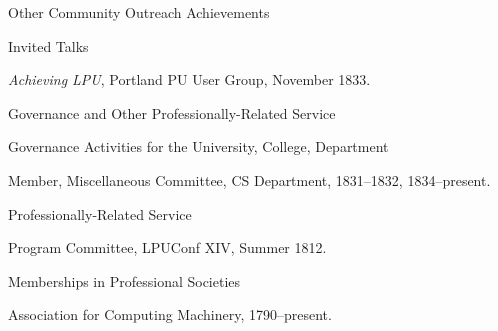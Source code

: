 \documentclass{psu-vita}
\begin{document}
%
\begin{majorhead}{Other Community Outreach Achievements}
  \begin{minorhead}{Invited Talks}
  \item {\em Achieving LPU},
    Portland PU User Group, November 1833.
  \end{minorhead}
\end{majorhead}
%
%
%
%
\begin{majorhead}{Governance and Other Professionally-Related Service}
  \begin{minorhead}{Governance Activities for the University,
                     College, Department}
    \item Member, Miscellaneous Committee, CS Department,
      1831--1832, 1834--present.
  \end{minorhead}
%
  \begin{minorhead}{Professionally-Related Service}
    \item Program Committee, LPUConf XIV, Summer 1812.
  \end{minorhead}
\end{majorhead}
%
\begin{majorhead}{Memberships in Professional Societies}
  \item Association for Computing Machinery, 1790--present.
\end{majorhead}
%


\end{document}
